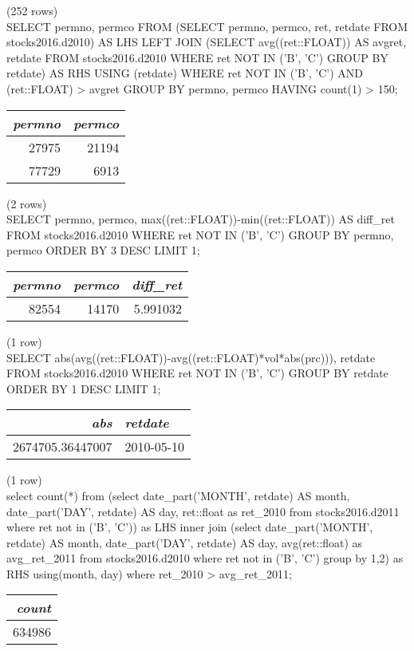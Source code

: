 \noindent (252 rows) \\

SELECT permno, permco FROM
 (SELECT permno, permco, ret, retdate
 FROM stocks2016.d2010) AS LHS
LEFT JOIN
 (SELECT avg((ret::FLOAT)) AS avgret, retdate
 FROM stocks2016.d2010
 WHERE ret NOT IN ('B', 'C')
 GROUP BY retdate) AS RHS
USING (retdate)
WHERE ret NOT IN ('B', 'C') AND (ret::FLOAT) > avgret
GROUP BY permno, permco
HAVING count(1) > 150;
\begin{tabular}{r | r}
\textit{permno} & \textit{permco} \\
\hline
27975 & 21194 \\
77729 & 6913 \\
\end{tabular}

\noindent (2 rows) \\

SELECT permno, permco, max((ret::FLOAT))-min((ret::FLOAT)) AS diff_ret
FROM stocks2016.d2010
WHERE ret NOT IN ('B', 'C')
GROUP BY permno, permco
ORDER BY 3 DESC
LIMIT 1;
\begin{tabular}{r | r | r}
\textit{permno} & \textit{permco} & \textit{diff\_ret} \\
\hline
82554 & 14170 & 5.991032 \\
\end{tabular}

\noindent (1 row) \\

SELECT abs(avg((ret::FLOAT))-avg((ret::FLOAT)*vol*abs(prc))), retdate
FROM stocks2016.d2010
WHERE ret NOT IN ('B', 'C')
GROUP BY retdate
ORDER BY 1 DESC
LIMIT 1;
\begin{tabular}{r | l}
\textit{abs} & \textit{retdate} \\
\hline
2674705.36447007 & 2010-05-10 \\
\end{tabular}

\noindent (1 row) \\

select count(*)
from
(select date_part('MONTH', retdate) AS month, date_part('DAY', retdate) AS day, ret::float as ret_2010
from stocks2016.d2011
where ret not in ('B', 'C')) as LHS 
inner join
(select date_part('MONTH', retdate) AS month, date_part('DAY', retdate) AS day, avg(ret::float) as avg_ret_2011
from stocks2016.d2010
where ret not in ('B', 'C')
group by 1,2) as RHS
using(month, day)
where ret_2010 > avg_ret_2011;
\begin{tabular}{r}
\textit{count} \\
\hline
634986 \\
\end{tabular}

